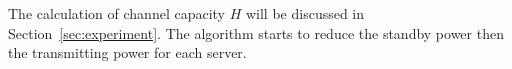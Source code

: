 The calculation of channel capacity $H$ will be discussed in Section~\ref{sec:experiment}.
The algorithm starts to reduce the standby power then the transmitting power for each server.
%
%
%
%
%
%
%
%
%
%
%
%




